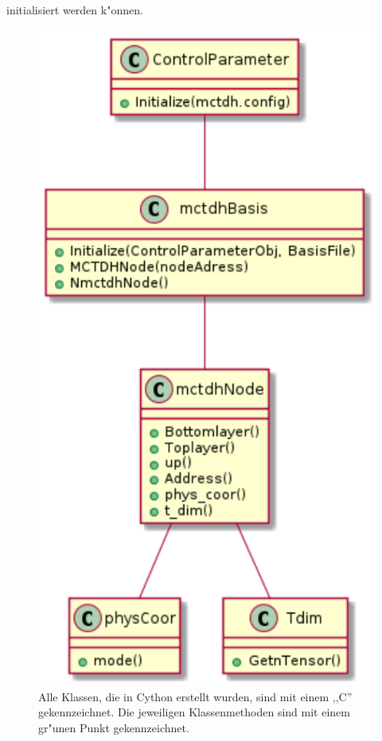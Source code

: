 initialisiert werden k"onnen. 
    
\begin{figure}
    \centering
    \includegraphics[scale=0.6]{figures/sequenceDiagram}
    \caption{Alle Klassen, die in Cython erstellt wurden, sind mit einem ,,C'' gekennzeichnet. Die jeweiligen Klassenmethoden sind mit einem
    gr"unen Punkt gekennzeichnet.}\label{fig:uml_Cython}
\end{figure}


